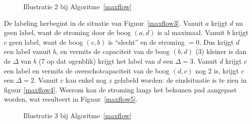 \begin{figure}[ht]
\begin{center}
 \hspace{1cm}
\end{center}
\caption{Illustratie 2 bij Algoritme~\ref{maxflow}}
\end{figure}

De labeling herbegint in de situatie van Figuur~\ref{maxflow3}. Vanuit
$a$ krijgt $d$ nu geen label, want de stroming door de boog $(a,d)$ is al
maximaal. Vanuit $b$ krijgt $c$ geen label, want de boog $(c,b)$ is
``slecht'' en de stroming $ = 0$. Dus krijgt $d$ een label vanuit $b$, en
vermits de capaciteit van de boog $(b,d)$ (3) kleiner is dan de $\Delta$
van $b$ (7 op dat ogenblik) krijgt het label van $d$ een $\Delta =
3$. Vanuit $d$ krijgt $c$ een label en vermits de overschotcapaciteit van
de boog $(d,c)$ nog 2 is, krijgt $c$ een $\Delta = 2$. Vanuit $c$ kan enkel
nog $z$ gelabeld worden: de eindsituatie is te zien in figuur
\ref{maxflow4}. Weerom kan de stroming langs het bekomen pad aangepast
worden, wat resulteert in Figuur~\ref{maxflow5}.

\begin{figure}[ht]
\begin{center}
 \hspace{1cm}
\end{center}
\caption{Illustratie 3 bij Algoritme~\ref{maxflow}}
\end{figure}

